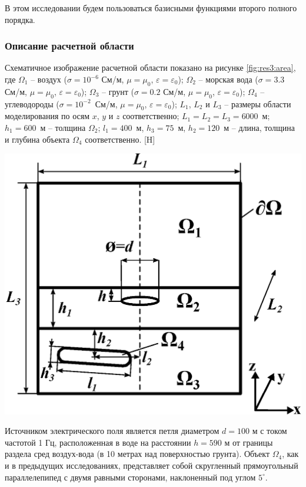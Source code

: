 \documentclass[a4paper,14pt]{article}
\makeatletter
\renewenvironment{figure}[1][\fps@figure]{
  \edef\@tempa{\noexpand\@float{figure}[#1]}
  \@tempa
  \addtocounter{foofigure}{1}
}{
  \end@float
}
\makeatother
\begin{document}
В этом исследовании будем пользоваться базисными функциями второго полного порядка.

\subsubsection{Описание расчетной области}
Схематичное изображение расчетной области показано на рисунке \ref{fig:res3:area}, где $\Omega_1$ -- воздух ($\sigma=10^{-6}$ См/м, $\mu=\mu_0$, $\varepsilon=\varepsilon_0$); $\Omega_2$ -- морская вода ($\sigma=3.3$ См/м, $\mu=\mu_0$, $\varepsilon=\varepsilon_0$); $\Omega_3$ -- грунт ($\sigma=0.2$ См/м, $\mu=\mu_0$, $\varepsilon=\varepsilon_0$); $\Omega_4$ -- углеводороды ($\sigma=10^{-2}$~См/м, $\mu=\mu_0$, $\varepsilon=\varepsilon_0$); $L_1$, $L_2$ и $L_3$ -- размеры области моделирования по осям $x$, $y$ и $z$ соответственно; $L_1 = L_2 = L_3 = 6000$~м; $h_1=600$~м -- толщина $\Omega_2$; $l_1=400$~м, $h_3=75$~м, $h_2=120$~м -- длина, толщина и глубина объекта $\Omega_4$ соответственно.
\begin{figure}[H]
	\centering
	\includegraphics[scale=0.7]{research-3/area/area_3layers_shift_3.eps}
	\caption{схематичное изображение расчетной области}
	\label{fig:res3:area}
\end{figure}

Источником электрического поля является петля диаметром $d=100$ м с током частотой 1 Гц, расположенная в воде на расстоянии $h=590$ м от границы раздела сред воздух-вода (в 10 метрах над поверхностью грунта). Объект $\Omega_4$, как и в предыдущих исследованиях, представляет собой скругленный прямоугольный параллелепипед с двумя равными сторонами, наклоненный под углом $5^{\circ}$.
\end{document}
